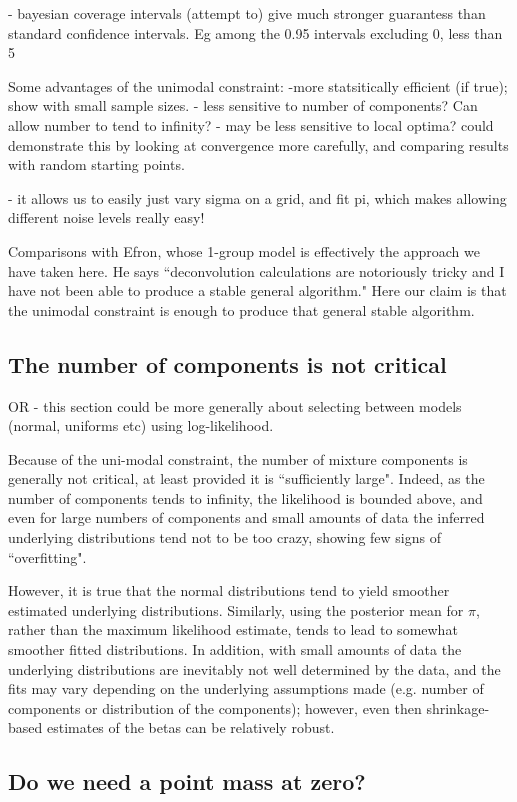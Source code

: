 \documentclass[11pt]{article}
\begin{document}
- bayesian coverage intervals (attempt to) give much stronger guarantess than standard confidence intervals. Eg among the 0.95 intervals excluding 0,
less than 5%

Some advantages of the unimodal constraint:
-more statsitically efficient (if true); show with small sample sizes.
- less sensitive to number of components? Can allow number to tend to infinity?
- may be less sensitive to local optima?
could demonstrate this by looking at convergence more carefully, and comparing
results with random starting points.

- it allows us to easily just vary sigma on a grid, and fit pi, which
makes allowing different noise levels really easy!

Comparisons with Efron, whose 1-group model is effectively the approach we have taken here.
He says ``deconvolution
calculations are notoriously tricky and I have not
been able to produce a stable general algorithm." Here our claim is that the unimodal constraint is enough to produce that
general stable algorithm.


\subsection{The number of components is not critical}
OR - this section could be more generally about selecting between
models (normal, uniforms etc) using log-likelihood.

Because of the uni-modal constraint, the number of mixture components
is generally not critical, at least provided it is ``sufficiently large". 
Indeed, as the number of components tends to infinity, the likelihood
is bounded above, and even for large numbers of components and small amounts of data the inferred underlying distributions tend not to be too crazy, showing few signs of ``overfitting". 

However, it is true that the normal distributions tend to yield smoother estimated underlying distributions. Similarly, using the posterior mean for $\pi$, rather
than the maximum likelihood estimate, tends to lead to somewhat smoother fitted distributions. In addition, with small amounts of data the underlying
distributions are inevitably not well determined by the data, and the fits may vary depending on the underlying assumptions made (e.g. number of components or distribution of the components); however, even then shrinkage-based estimates
of the betas can be relatively robust.

\subsection{Do we need a point mass at zero?}
\end{document}
